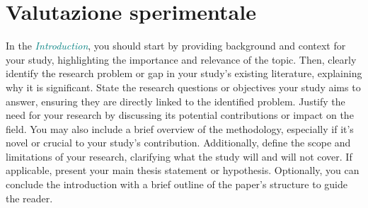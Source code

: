 \section{Valutazione sperimentale}
\label{sec:expval}


In the \textcolor{teal}{\textit{Introduction}}, you should start by providing background and context for your study, highlighting the importance and relevance of the topic. 
Then, clearly identify the research problem or gap in your study's existing literature, explaining why it is significant. 
State the research questions or objectives your study aims to answer, ensuring they are directly linked to the identified problem. 
Justify the need for your research by discussing its potential contributions or impact on the field.
You may also include a brief overview of the methodology, especially if it's novel or crucial to your study's contribution. 
Additionally, define the scope and limitations of your research, clarifying what the study will and will not cover.
If applicable, present your main thesis statement or hypothesis. 
Optionally, you can conclude the introduction with a brief outline of the paper's structure to guide the reader.